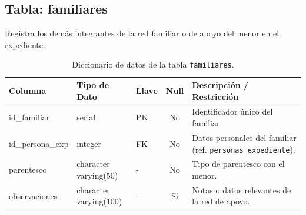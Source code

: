 \subsection{Tabla: familiares}
Registra los demás integrantes de la red familiar o de apoyo del menor en el expediente.
\begin{table}[htbp!]
\centering
\begin{tabular}{|l|l|l|c|l|}
\hline
\textbf{Columna} & \textbf{Tipo de Dato} & \textbf{Llave} & \textbf{Null} & \textbf{Descripción / Restricción} \\
\hline
id\_familiar & serial & PK & No & Identificador único del familiar. \\
id\_persona\_exp & integer & FK & No & Datos personales del familiar (ref. \texttt{personas\_expediente}). \\
parentesco & character varying(50) & - & No & Tipo de parentesco con el menor. \\
observaciones & character varying(100) & - & Sí & Notas o datos relevantes de la red de apoyo. \\
\hline
\end{tabular}
\caption{Diccionario de datos de la tabla \texttt{familiares}.}
\label{tbl:diccionarioFamiliares}
\end{table}


